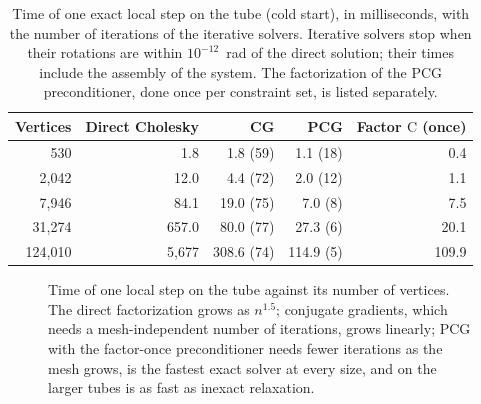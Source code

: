 \documentclass{birkjour}
\theoremstyle{remark}
\numberwithin{equation}{section}
\begin{document}
\begin{table}[t]
  \centering
  \caption{Time of one exact local step on the tube (cold start), in milliseconds, with the number of iterations of the iterative solvers. Iterative solvers stop when their rotations are within $10^{-12}$~rad of the direct solution; their times include the assembly of the system. The factorization of the PCG preconditioner, done once per constraint set, is listed separately.}
  \label{tab:solvers}
  {\footnotesize
  \begin{tabular}{rrrrr}
    \toprule
    Vertices & Direct Cholesky & CG & PCG & Factor $\mathrm C$ (once) \\
    \midrule
    530       & 1.8   & 1.8 (59) & 1.1 (18) & 0.4 \\
    2{,}042   & 12.0  & 4.4 (72) & 2.0 (12) & 1.1 \\
    7{,}946   & 84.1  & 19.0 (75) & 7.0 (8) & 7.5 \\
    31{,}274  & 657.0 & 80.0 (77) & 27.3 (6) & 20.1 \\
    124{,}010 & 5{,}677 & 308.6 (74) & 114.9 (5) & 109.9 \\
    \bottomrule
  \end{tabular}}
\end{table}

\begin{figure}[t]
  \centering
  \caption{Time of one local step on the tube against its number of vertices. The direct factorization grows as $n^{1.5}$; conjugate gradients, which needs a mesh-independent number of iterations, grows linearly; PCG with the factor-once preconditioner needs fewer iterations as the mesh grows, is the fastest exact solver at every size, and on the larger tubes is as fast as inexact relaxation.}
  \label{fig:cost}
\end{figure}
\end{document}
